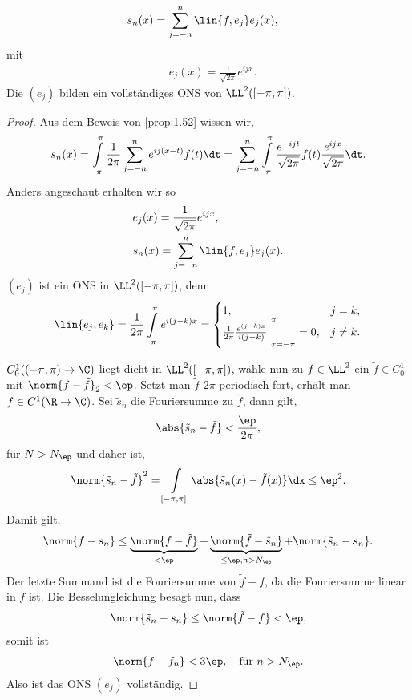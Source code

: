 \begin{prop}
\label{prop:1.58}
\begin{align*}
&s_n(x) = \sum\limits_{j=-n}^n \lin{f,e_j}e_j(x),
\end{align*}
mit
\begin{align*}
&e_{j}(x) = \frac{1}{\sqrt{2\pi}}e^{ijx}.
\end{align*}
Die $(e_j)$ bilden ein vollständiges ONS von $\LL^2([-\pi,\pi])$.\fishhere
\end{prop}
\begin{proof}

Aus dem Beweis von \ref{prop:1.52} wissen wir,
\begin{align*}
s_n(x) = \int\limits_{-\pi}^\pi \frac{1}{2\pi}\sum\limits_{j=-n}^n
e^{ij(x-t)}f(t)\dt
= \sum\limits_{j=-n}^n \int\limits_{-\pi}^\pi \frac{e^{-ijt}}{\sqrt{2\pi}}
f(t) \frac{e^{ijx}}{\sqrt{2\pi}}\dt.
\end{align*}
Anders angeschaut erhalten wir so
\begin{align*}
&e_{j}(x) = \frac{1}{\sqrt{2\pi}}e^{ijx},\\
&s_n(x) = \sum\limits_{j=-n}^n \lin{f,e_j}e_j(x).
\end{align*}
$(e_j)$ ist ein ONS in $\LL^2([-\pi,\pi])$, denn
\begin{align*}
\lin{e_j,e_k} = \frac{1}{2\pi}\int\limits_{-\pi}^\pi e^{i(j-k)x} = 
\begin{cases}
1, & j=k,\\
\frac{1}{2\pi}\frac{e^{(j-k)x}}{i(j-k)}\bigg|_{x=-\pi}^\pi = 0, & j\neq k.
\end{cases}
\end{align*}

$C_0^1((-\pi,\pi)\to\C)$ liegt dicht in $\LL^2([-\pi,\pi])$, wähle nun zu
$f\in\LL^2$ ein $\tilde{f}\in C_0^1$ mit $\norm{f-\tilde{f}}_2<\ep$. Setzt man
$\tilde{f}$ $2\pi$-periodisch fort, erhält man $f\in C^1(\R\to\C)$. Sei
$\tilde{s}_n$ die Fouriersumme zu $\tilde{f}$, dann gilt,
\begin{align*}
\abs{\tilde{s}_n - \tilde{f}} < \frac{\ep}{2\pi}, 
\end{align*}
für $N>N_\ep$ und daher ist,
\begin{align*}
\norm{\tilde{s}_n - \tilde{f}}^2 = \int\limits_{[-\pi,\pi]} \abs{\tilde{s}_n(x)
-\tilde{f}(x)}\dx \le \ep^2.
\end{align*}
Damit gilt,
\begin{align*}
\norm{f-s_n} \le \underbrace{\norm{f-\tilde{f}}}_{<\ep} +
\underbrace{\norm{\tilde{f}-\tilde{s}_n}}_{\le \ep, n>N_\ep} +
\norm{\tilde{s}_n - s_n}.
\end{align*}
Der letzte Summand ist die Fouriersumme von $\tilde{f}-f$, da die Fouriersumme
linear in $f$ ist. Die Besselungleichung besagt nun, dass
\begin{align*}
\norm{\tilde{s}_n - s_n} \le \norm{\tilde{f}-f} < \ep,
\end{align*}
somit ist
\begin{align*}
\norm{f-f_n} < 3\ep,\quad\text{für } n> N_\ep.
\end{align*}
Also ist das ONS $(e_j)$ vollständig.\qedhere
\end{proof}
